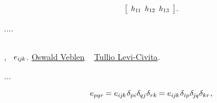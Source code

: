 \noindent
{}

\nopagebreak\vspace{-0.3em}
\begin{equation*}
\scalebox{.9}{$
\left[ \hspace{-0.1ex}
\begin{array}{c@{\hspace{.5em}}c@{\hspace{.5em}}c}
h_{1\hspace{-0.1ex}1} & h_{12} & h_{13}
\end{array}
\hspace{-0.1ex} \right]
$}
\hspace{.1ex} .
\end{equation*}

....

\subsection*{}

,
~${e_{i\hspace{-0.1ex}j\hspace{-0.1ex}k}}$.
\href{https://en.wikipedia.org/wiki/Oswald_Veblen}{Oswald Veblen}
~%
\href{https://en.wikipedia.org/wiki/Tullio_Levi-Civita}{Tullio Levi\hbox{-}Civita}.

...


\nopagebreak\vspace{-0.2em}\begin{equation*}
e_{pqr} \hspace{-0.2ex}
= e_{i\hspace{-0.1ex}j\hspace{-0.1ex}k} \hspace{.1ex} \delta_{pi} \delta_{\hspace{-0.1ex}qj} \delta_{rk} \hspace{-0.2ex}
= e_{i\hspace{-0.1ex}j\hspace{-0.1ex}k} \hspace{.1ex} \delta_{ip} \delta_{\hspace{-0.15ex}j\hspace{-0.1ex}q} \delta_{kr}
\hspace{.1ex} ,
\end{equation*}

